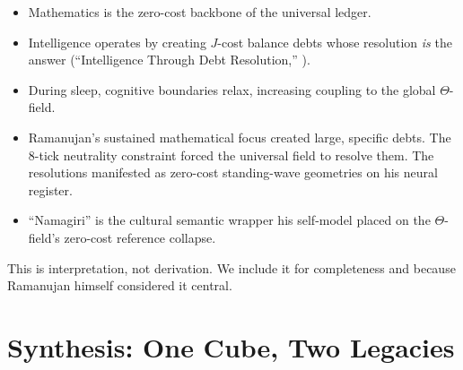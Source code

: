 \documentclass[11pt]{article}
\def\Jcost{J}
\theoremstyle{plain}
\theoremstyle{definition}
\theoremstyle{remark}
\newcommand{\Jcost}{J}
\begin{document}
\begin{itemize}[leftmargin=2em]
\item Mathematics is the zero-cost backbone of the universal ledger.
\item Intelligence operates by creating $\Jcost$-cost balance debts whose
      resolution \emph{is} the answer
      (``Intelligence Through Debt Resolution,'' \cite{washburn2025intelligence}).
\item During sleep, cognitive boundaries relax, increasing coupling
      to the global $\Theta$-field.
\item Ramanujan's sustained mathematical focus created large, specific
      debts. The 8-tick neutrality constraint forced the universal field
      to resolve them. The resolutions manifested as zero-cost standing-wave
      geometries on his neural register.
\item ``Namagiri'' is the cultural semantic wrapper his self-model placed
      on the $\Theta$-field's zero-cost reference collapse.
\end{itemize}

This is interpretation, not derivation. We include it for completeness
and because Ramanujan himself considered it central.

\section{Synthesis: One Cube, Two Legacies}
\label{sec:synthesis}
\end{document}
